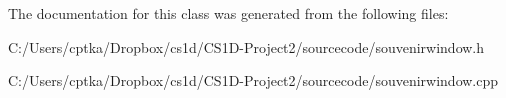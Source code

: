 The documentation for this class was generated from the following files\+:\begin{DoxyCompactItemize}
\item 
C\+:/\+Users/cptka/\+Dropbox/cs1d/\+C\+S1\+D-\/\+Project2/sourcecode/souvenirwindow.\+h\item 
C\+:/\+Users/cptka/\+Dropbox/cs1d/\+C\+S1\+D-\/\+Project2/sourcecode/souvenirwindow.\+cpp\end{DoxyCompactItemize}
